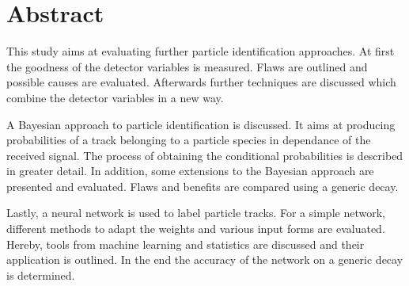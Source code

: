 \chapter*{Abstract}

This study aims at evaluating further particle identification approaches.
At first the goodness of the detector variables is measured. Flaws are outlined and possible causes are evaluated. Afterwards further techniques are discussed which combine the detector variables in a new way.

A Bayesian approach to particle identification is discussed. It aims at producing probabilities of a track belonging to a particle species in dependance of the received signal. The process of obtaining the conditional probabilities is described in greater detail. In addition, some extensions to the Bayesian approach are presented and evaluated. Flaws and benefits are compared using a generic decay.

Lastly, a neural network is used to label particle tracks. For a simple network, different methods to adapt the weights and various input forms are evaluated. Hereby, tools from machine learning and statistics are discussed and their application is outlined. In the end the accuracy of the network on a generic decay is determined.
